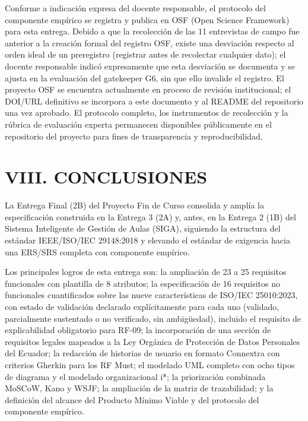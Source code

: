 
Conforme a indicación expresa del docente responsable, el protocolo del componente empírico se registra y publica en OSF (Open Science Framework) para esta entrega. Debido a que la recolección de las 11 entrevistas de campo fue anterior a la creación formal del registro OSF, existe una desviación respecto al orden ideal de un preregistro (registrar antes de recolectar cualquier dato); el docente responsable indicó expresamente que esta desviación se documenta y se ajusta en la evaluación del gatekeeper G6, sin que ello invalide el registro. El proyecto OSF se encuentra actualmente en proceso de revisión institucional; el DOI/URL definitivo se incorpora a este documento y al README del repositorio una vez aprobado. El protocolo completo, los instrumentos de recolección y la rúbrica de evaluación experta permanecen disponibles públicamente en el repositorio del proyecto para fines de transparencia y reproducibilidad.


\section*{VIII. CONCLUSIONES}


La Entrega Final (2B) del Proyecto Fin de Curso consolida y amplía la especificación construida en la Entrega 3 (2A) y, antes, en la Entrega 2 (1B) del Sistema Inteligente de Gestión de Aulas (SIGA), siguiendo la estructura del estándar IEEE/ISO/IEC 29148:2018 y elevando el estándar de exigencia hacia una ERS/SRS completa con componente empírico.


Los principales logros de esta entrega son: la ampliación de 23 a 25 requisitos funcionales con plantilla de 8 atributos; la especificación de 16 requisitos no funcionales cuantificados sobre las nueve características de ISO/IEC 25010:2023, con estado de validación declarado explícitamente para cada uno (validado, parcialmente sustentado o no verificado, sin ambigüedad), incluido el requisito de explicabilidad obligatorio para RF-09; la incorporación de una sección de requisitos legales mapeados a la Ley Orgánica de Protección de Datos Personales del Ecuador; la redacción de historias de usuario en formato Connextra con criterios Gherkin para los RF Must; el modelado UML completo con ocho tipos de diagrama y el modelado organizacional i*; la priorización combinada MoSCoW, Kano y WSJF; la ampliación de la matriz de trazabilidad; y la definición del alcance del Producto Mínimo Viable y del protocolo del componente empírico.


